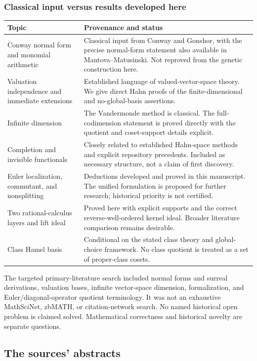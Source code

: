 \documentclass[11pt,letterpaper]{article}
\numberwithin{equation}{section}
\theoremstyle{definition}
\theoremstyle{remark}
\begin{document}
\subsubsection{Classical input versus results developed here}
\begin{longtable}{@{}p{}p{}@{}}
\toprule
Topic & Provenance and status\\
\midrule
\endhead
Conway normal form and monomial arithmetic & Classical input from Conway and Gonshor, with the precise normal-form statement also available in Mantova--Matusinski. Not reproved from the genetic construction here.\\[.4em]
Valuation independence and immediate extensions & Established language of valued-vector-space theory. We give direct Hahn proofs of the finite-dimensional and no-global-basis assertions.\\[.4em]
Infinite dimension & The Vandermonde method is classical. The full-codimension statement is proved directly with the quotient and coset-support details explicit.\\[.4em]
Completion and invisible functionals & Closely related to established Hahn-space methods and explicit repository precedents. Included as necessary structure, not a claim of first discovery.\\[.4em]
Euler localization, commutant, and nonsplitting & Deductions developed and proved in this manuscript. The unified formulation is proposed for further research; historical priority is not certified.\\[.4em]
Two rational-calculus layers and lift ideal & Proved here with explicit supports and the correct reverse-well-ordered kernel ideal. Broader literature comparison remains desirable.\\[.4em]
Class Hamel basis & Conditional on the stated class theory and global-choice framework. No class quotient is treated as a set of proper-class cosets.\\
\bottomrule
\end{longtable}
The targeted primary-literature search included normal forms and surreal derivations, valuation bases, infinite vector-space dimension, formalization, and Euler/diagonal-operator quotient terminology. It was not an exhaustive MathSciNet, zbMATH, or citation-network search. No named historical open problem is claimed solved. Mathematical correctness and historical novelty are separate questions.

\subsection{The sources' abstracts}
\end{document}
